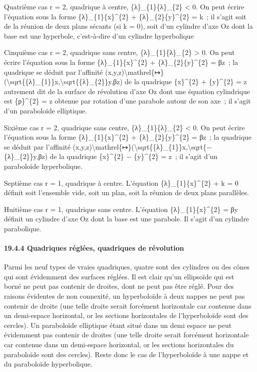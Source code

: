 \documentclass[]{article}
\begin{document}
Quatrième cas r = 2, quadrique à centre, \{λ\}\_\{1\}\{λ\}\_\{2\}
\textless{} 0. On peut écrire l'équation sous la forme
\{λ\}\_\{1\}\{x\}\^{}\{2\} + \{λ\}\_\{2\}\{y\}\^{}\{2\} = k~; il s'agit
soit de la réunion de deux plans sécants (si k = 0), soit d'un cylindre
d'axe Oz dont la base est une hyperbole, c'est-à-dire d'un cylindre
hyperbolique

Cinquième cas r = 2, quadrique sans centre, \{λ\}\_\{1\}\{λ\}\_\{2\}
\textgreater{} 0. On peut écrire l'équation sous la forme
\{λ\}\_\{1\}\{x\}\^{}\{2\} + \{λ\}\_\{2\}\{y\}\^{}\{2\} = βz~; la
quadrique se déduit par l'affinité
(x,y,z)\textbackslash{}mathrel\{↦\}(\textbackslash{}sqrt\{\{λ\}\_\{1\}\}x,\textbackslash{}sqrt\{\{λ\}\_\{2\}\}y,βz)
de la quadrique \{x\}\^{}\{2\} + \{y\}\^{}\{2\} = z autrement dit de la
surface de révolution d'axe Oz dont une équation cylindrique est
\{ρ\}\^{}\{2\} = z obtenue par rotation d'une parabole autour de son
axe~; il s'agit d'un paraboloïde elliptique.

Sixième cas r = 2, quadrique sans centre, \{λ\}\_\{1\}\{λ\}\_\{2\}
\textless{} 0. On peut écrire l'équation sous la forme
\{λ\}\_\{1\}\{x\}\^{}\{2\} + \{λ\}\_\{2\}\{y\}\^{}\{2\} = βz~; la
quadrique se déduit par l'affinité
(x,y,z)\textbackslash{}mathrel\{↦\}(\textbackslash{}sqrt\{\{λ\}\_\{1\}\}x,\textbackslash{}sqrt\{−\{λ\}\_\{2\}\}y,βz)
de la quadrique \{x\}\^{}\{2\} − \{y\}\^{}\{2\} = z~; il s'agit d'un
paraboloïde hyperbolique.

Septième cas r = 1, quadrique à centre. L'équation
\{λ\}\_\{1\}\{x\}\^{}\{2\} + k = 0 définit soit l'ensemble vide, soit un
plan, soit la réunion de deux plans parallèles.

Huitième cas r = 1, quadrique sans centre. L'équation
\{λ\}\_\{1\}\{x\}\^{}\{2\} = βy définit un cylindre d'axe Oz dont la
base est une parabole. Il s'agit d'un cylindre parabolique.

\paragraph{19.4.4 Quadriques réglées, quadriques de révolution}

Parmi les neuf types de vraies quadriques, quatre sont des cylindres ou
des cônes qui sont évidemment des surfaces réglées. Il est clair qu'un
ellipsoïde qui est borné ne peut pas contenir de droites, dont ne peut
pas être réglé. Pour des raisons évidentes de non connexité, un
hyperboloïde à deux nappes ne peut pas contenir de droite (une telle
droite serait forcément horizontale car contenue dans un demi-espace
horizontal, or les sections horizontales de l'hyperboloïde sont des
cercles). Un paraboloïde elliptique étant situé dans un demi espace ne
peut évidemment pas contenir de droites (une telle droite serait
forcément horizontale car contenue dans un demi-espace horizontal, or
les sections horizontales du paraboloïde sont des cercles). Reste donc
le cas de l'hyperboloïde à une nappe et du paraboloïde hyperbolique.
\end{document}
